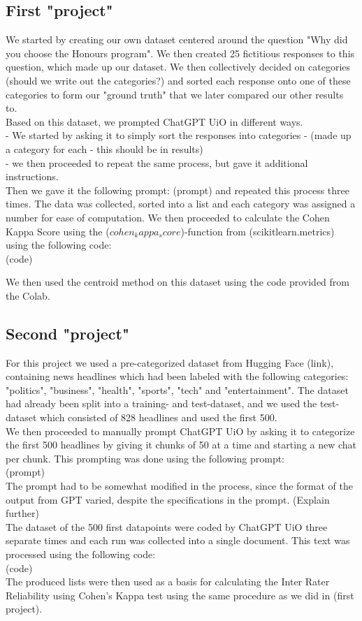 \documentclass[11pt,a4paper,oldfontcommands]{memoir}
\begin{document}
\subsection*{First "project"}
\begin{flushleft}
We started by creating our own dataset centered around the question "Why did you choose the Honours program".
We then created 25 fictitious responses to this question, which made up our dataset. We then collectively decided on categories 
(should we write out the categories?) and sorted each response onto one of these categories to form our "ground truth" that we later 
compared our other results to. \\
Based on this dataset, we prompted ChatGPT UiO in different ways. \\
- We started by asking it to simply sort the responses into categories - (made up a category for each - this should be in results)\\
- we then proceeded to repeat the same process, but gave it additional instructions.\\[10pt]

Then we gave it the following prompt: (prompt) and repeated this process three times. The data was collected, sorted into a list and each category was assigned
a number for ease of computation. We then proceeded to calculate the Cohen Kappa Score using the ($cohen_kappa_score$)-function from (scikitlearn.metrics) using the following code:\\
(code)

We then used the centroid method on this dataset using the code provided from the Colab. 

\subsection*{Second "project"}
For this project we used a pre-categorized dataset from Hugging Face (link), containing news headlines which had been labeled with the following categories: "politics", "business", "health", "sports", "tech" and "entertainment".
The dataset had already been split into a training- and test-dataset, and we used the test-dataset which consisted of 828 headlines and used the first 500. \\
We then proceeded to manually prompt ChatGPT UiO by asking it to categorize the first 500 headlines by giving it chunks of 50 at a time and starting a new chat per chunk. This prompting 
was done using the following prompt:\\
(prompt)\\
The prompt had to be somewhat modified in the process, since the format of the output from GPT varied, despite the specifications in the prompt. (Explain further)\\[10pt]
The dataset of the 500 first datapoints were coded by ChatGPT UiO three separate times and each run was collected into a single document. This text was processed using the following code:\\
(code)\\
The produced lists were then used as a basis for calculating the Inter Rater Reliability using Cohen's Kappa test using the same procedure as we did in (first project).


\end{flushleft}
\end{document}
